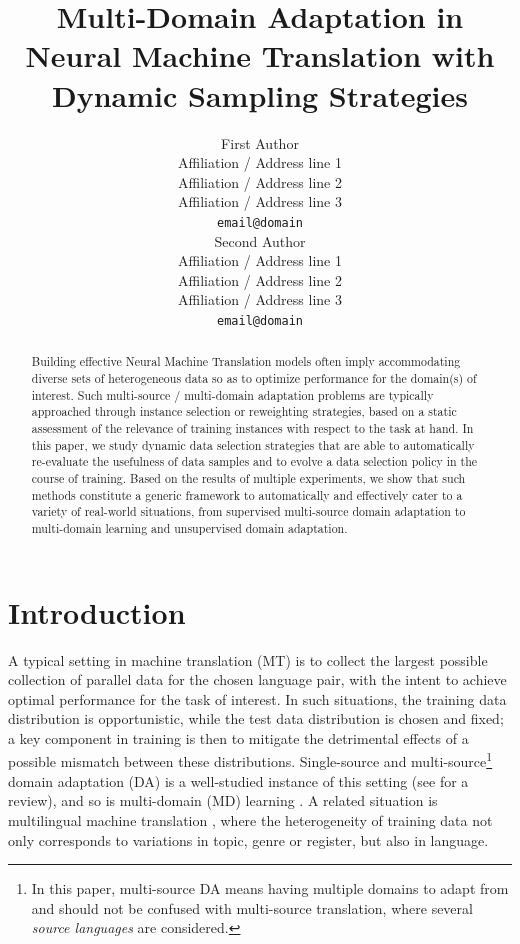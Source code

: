\documentclass[11pt]{article}
\title{Multi-Domain Adaptation in Neural Machine Translation with Dynamic Sampling Strategies}
\author{First Author \\
  Affiliation / Address line 1 \\
  Affiliation / Address line 2 \\
  Affiliation / Address line 3 \\
  \texttt{email@domain} \\\And
  Second Author \\
  Affiliation / Address line 1 \\
  Affiliation / Address line 2 \\
  Affiliation / Address line 3 \\
  \texttt{email@domain} \\}
\date{}
\newcommand{\fyDone}[1]{\done[FY]\Todo[FY:]{\textcolor{orange}{#1}}}
\newcommand{\revision}[1]{\textcolor{red}{#1}}
\begin{document}
\maketitle
\setlength{\abovedisplayskip}{2pt}
\setlength{\belowdisplayskip}{2pt}
\begin{abstract}
  Building effective Neural Machine Translation models often imply accommodating diverse sets of heterogeneous data so as to optimize performance for the domain(s) of interest. Such multi-source / multi-domain adaptation problems are typically approached through instance selection or reweighting strategies, based on a static assessment of the relevance of training instances with respect to the task at hand. In this paper, we study dynamic data selection strategies that are able to automatically re-evaluate the usefulness of data samples and to evolve a data selection policy in the course of training. Based on the results of multiple experiments, we show that such methods constitute a generic framework to automatically and effectively cater to a variety of real-world situations, from supervised multi-source domain adaptation to multi-domain learning and unsupervised domain adaptation. 
\end{abstract}

\section{Introduction}\label{sec:intro}
A typical setting in machine translation (MT) is to collect the largest possible collection of parallel data for the chosen language pair, with the intent to achieve optimal performance for the task of interest. In such situations, the training data distribution is opportunistic, while the test data distribution is chosen and fixed; a key component in training is then to mitigate the detrimental effects of a possible mismatch between these distributions. Single-source and multi-source\footnote{In this paper, multi-source DA means having multiple domains to adapt from and should not be confused with multi-source translation, where several \emph{source languages} are considered.} domain adaptation (DA) is a well-studied instance of this setting (see \citet{Chu2017comparison,Saunders21domain} for a review), and so is multi-domain (MD) learning \citep{Chu18multilingual,Zeng18multidomain,Jiang19multidomain,Pham21revisiting}. A related situation is multilingual machine translation \citep{Firat16multiway,Ha16towards,Johnson17google,Aharoni19massively},\fyDone{Fix ref}
where the heterogeneity of training data not only corresponds to variations in topic, genre or register, but also in language.
\end{document}
